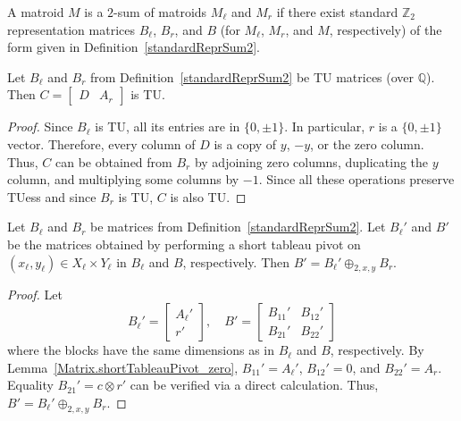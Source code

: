 \begin{definition}
    \label{Matroid.IsSum2of}
    \leanok
    A matroid $M$ is a $2$-sum of matroids $M_{\ell}$ and $M_{r}$ if there exist standard $\mathbb{Z}_{2}$ representation matrices $B_{\ell}$, $B_{r}$, and $B$ (for $M_{\ell}$, $M_{r}$, and $M$, respectively) of the form given in Definition~\ref{standardReprSum2}.
\end{definition}

\begin{lemma}
    \label{Matrix.IsTotallyUnimodular.fromCols_outer}
    \leanok
    Let $B_{\ell}$ and $B_{r}$ from Definition~\ref{standardReprSum2} be TU matrices (over $\mathbb{Q}$). Then $C = \begin{bmatrix} D & A_{r} \end{bmatrix}$ is TU.
\end{lemma}

\begin{proof}
    \leanok
    Since $B_{\ell}$ is TU, all its entries are in $\{0, \pm 1\}$. In particular, $r$ is a $\{0, \pm 1\}$ vector. Therefore, every column of $D$ is a copy of $y$, $-y$, or the zero column. Thus, $C$ can be obtained from $B_{r}$ by adjoining zero columns, duplicating the $y$ column, and multiplying some columns by $-1$. Since all these operations preserve TUess and since $B_{r}$ is TU, $C$ is also TU.
\end{proof}

\begin{lemma}
    \label{standardReprSum2_shortTableauPivot}
    \leanok
    Let $B_{\ell}$ and $B_{r}$ be matrices from Definition~\ref{standardReprSum2}. Let $B_{\ell}'$ and $B'$ be the matrices obtained by performing a short tableau pivot on $(x_{\ell}, y_{\ell}) \in X_{\ell} \times Y_{\ell}$ in $B_{\ell}$ and $B$, respectively. Then $B' = B_{\ell}' \oplus_{2, x, y} B_{r}$.
\end{lemma}

\begin{proof}
    \leanok
    Let
    \[
        B_{\ell}' = \begin{bmatrix} A_{\ell}' \\ r' \end{bmatrix}, \quad
        B' = \begin{bmatrix} B_{11}' & B_{12}' \\ B_{21}' & B_{22}' \end{bmatrix}
    \]
    where the blocks have the same dimensions as in $B_{\ell}$ and $B$, respectively. By Lemma~\ref{Matrix.shortTableauPivot_zero}, $B_{11}' = A_{\ell}'$, $B_{12}' = 0$, and $B_{22}' = A_{r}$. Equality $B_{21}' = c \otimes r'$ can be verified via a direct calculation. Thus, $B' = B_{\ell}' \oplus_{2, x, y} B_{r}$.
\end{proof}

